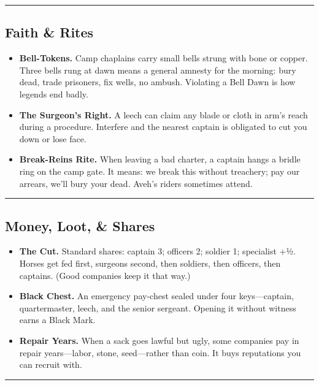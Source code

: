 \documentclass[11pt]{article}
\begin{document}
\rule{\textwidth}{0.4pt}

\subsection*{Faith \& Rites}

\begin{itemize}
    \item \textbf{Bell-Tokens.} Camp chaplains carry small bells strung with bone or copper. Three bells rung at dawn means a general amnesty for the morning: bury dead, trade prisoners, fix wells, no ambush. Violating a Bell Dawn is how legends end badly.
    
    \item \textbf{The Surgeon's Right.} A leech can claim any blade or cloth in arm's reach during a procedure. Interfere and the nearest captain is obligated to cut you down or lose face.
    
    \item \textbf{Break-Reins Rite.} When leaving a bad charter, a captain hangs a bridle ring on the camp gate. It means: we break this without treachery; pay our arrears, we'll bury your dead. Aveh's riders sometimes attend.
\end{itemize}

\rule{\textwidth}{0.4pt}

\subsection*{Money, Loot, \& Shares}

\begin{itemize}
    \item \textbf{The Cut.} Standard shares: captain 3; officers 2; soldier 1; specialist +½. Horses get fed first, surgeons second, then soldiers, then officers, then captains. (Good companies keep it that way.)
    
    \item \textbf{Black Chest.} An emergency pay-chest sealed under four keys---captain, quartermaster, leech, and the senior sergeant. Opening it without witness earns a Black Mark.
    
    \item \textbf{Repair Years.} When a sack goes lawful but ugly, some companies pay in repair years---labor, stone, seed---rather than coin. It buys reputations you can recruit with.
\end{itemize}

\rule{\textwidth}{0.4pt}
\end{document}
